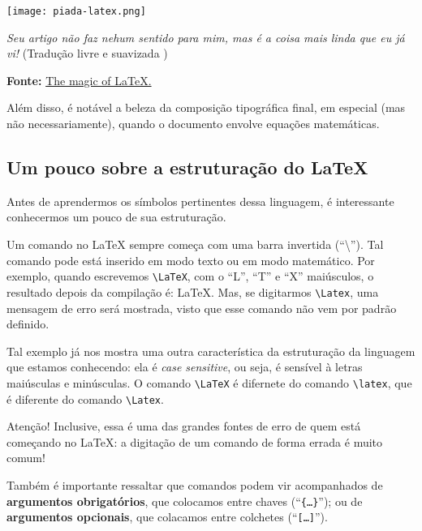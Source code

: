 \begin{marginfigure}
  \texttt{[image: piada-latex.png]}
  
  {
    \sffamily
    \textit{Seu artigo não faz nehum sentido para 
    mim, mas é a coisa mais linda que eu já vi!}
    (Tradução livre e suavizada )
  }
  
  {\textsf{\textbf{Fonte:}} \href{http://nvisnjic.com/2015/01/13/mathjax-magic.html}{The magic of LaTeX.}}
\end{marginfigure}

Além disso, é notável a beleza da composição tipográfica final, em especial (mas
não necessariamente), quando o documento envolve equações matemáticas.

\subsection{Um pouco sobre a estruturação do LaTeX} %

Antes de aprendermos os símbolos pertinentes dessa linguagem, é interessante 
conhecermos um pouco de sua estruturação.

Um comando no \LaTeX{} sempre começa com uma barra invertida (``\textbackslash'').
Tal comando pode está inserido em \textsf{modo texto} ou em \textsf{modo matemático}.
Por exemplo, quando escrevemos \verb|\LaTeX|, com o ``L'', ``T'' e ``X'' maiúsculos, 
o resultado depois da compilação é: \LaTeX.
Mas, se digitarmos \verb|\Latex|, uma mensagem de erro será mostrada, visto que 
esse comando não vem por padrão definido.

Tal exemplo já nos mostra uma outra característica da estruturação da linguagem 
que estamos conhecendo: ela é \textit{case sensitive}, ou seja, é sensível à
letras maiúsculas e minúsculas.
O comando \verb|\LaTeX| é difernete do comando \verb|\latex|, que é diferente do
comando \verb|\Latex|.

\begin{atencao}{Atenção!}{\exclamacao}
  Inclusive, essa é uma das grandes fontes de erro de quem está começando no 
  \LaTeX: a digitação de um comando de forma errada é muito comum!
\end{atencao}

Também é importante ressaltar que comandos podem vir acompanhados de 
\textbf{\textsf{argumentos obrigatórios}}, que colocamos entre \textsf{chaves} 
(``\texttt{\{\ldots\}}''); ou de \textbf{\textsf{argumentos opcionais}}, que colacamos 
entre \textsf{colchetes} (``\texttt{[\ldots]}'').

